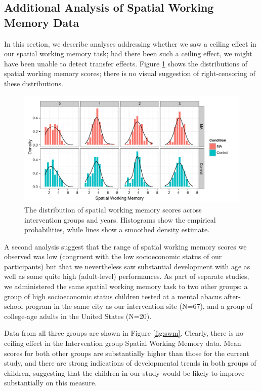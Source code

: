 \documentclass[11pt]{article}
\begin{document}
\subsection{Additional Analysis of Spatial Working Memory Data}

In this section, we describe analyses addressing whether we saw a ceiling effect in our spatial working memory task; had there been such a ceiling effect, we might have been unable to detect transfer effects. Figure \ref{fig:densities} shows the distributions of spatial working memory scores; there is no visual suggestion of right-censoring of these distributions. 

\begin{figure}[H]
\begin{center}
\includegraphics[width=6.5in]{figures/swmdensities.pdf}
\end{center}
\caption{The distribution of spatial working memory scores across intervention groups and years. Histograms show the empirical probabilities, while lines show a smoothed density estimate.}
\label{fig:densities}
\end{figure}

A second analysis suggest that the range of spatial working memory scores we observed was low (congruent with the low socioeconomic status of our participants) but that we nevertheless saw substantial development with age as well as some quite high (adult-level) performances. As part of separate studies, we administered the same spatial working memory task to two other groups: a group of high socioeconomic status children tested at a mental abacus after-school program in the same city as our intervention site (N=67), and a group of college-age adults in the United States (N=20). 

Data from all three groups are shown in Figure \ref{fig:swm}. Clearly, there is no ceiling effect in the Intervention group Spatial Working Memory data. Mean scores for both other groups are substantially higher than those for the current study, and there are strong indications of developmental trends in both groups of children, suggesting that the children in our study would be likely to improve substantially on this measure. 
\end{document}
